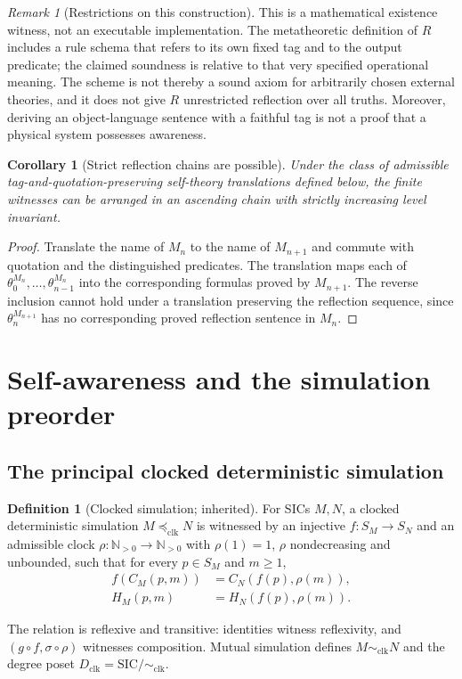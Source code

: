 \documentclass[11pt,letterpaper]{article}
\newtheorem{corollary}[theorem]{Corollary}
\theoremstyle{definition}\newtheorem{definition}[theorem]{Definition}\newtheorem{example}[theorem]{Example}\newtheorem{protocol}[theorem]{Protocol}\newtheorem{question}[theorem]{Open Problem}
\theoremstyle{remark}\newtheorem{remark}[theorem]{Remark}
\newcommand{\N}{\mathbb N}\newcommand{\Pset}{\mathcal P}\newcommand{\Con}{\operatorname{Con}}
\newcommand{\clksim}{\preceq_{\mathrm{clk}}}
\newcommand{\Nth}{\N_{>0}}
\begin{document}
\begin{remark}[Restrictions on this construction]
This is a mathematical existence witness, not an executable implementation. The metatheoretic definition of $R$ includes a rule schema that refers to its own fixed tag and to the output predicate; the claimed soundness is relative to that very specified operational meaning. The scheme is not thereby a sound axiom for arbitrarily chosen external theories, and it does not give $R$ unrestricted reflection over all truths. Moreover, deriving an object-language sentence with a faithful tag is not a proof that a physical system possesses awareness.
\end{remark}
\begin{corollary}[Strict reflection chains are possible]
Under the class of admissible tag-and-quotation-preserving self-theory translations defined below, the finite witnesses can be arranged in an ascending chain with strictly increasing level invariant.
\end{corollary}
\begin{proof}
Translate the name of $M_n$ to the name of $M_{n+1}$ and commute with quotation and the distinguished predicates. The translation maps each of $\theta_0^{M_n},\dots,\theta_{n-1}^{M_n}$ into the corresponding formulas proved by $M_{n+1}$. The reverse inclusion cannot hold under a translation preserving the reflection sequence, since $\theta_n^{M_{n+1}}$ has no corresponding proved reflection sentence in $M_n$.
\end{proof}

\section{Self-awareness and the simulation preorder}
\subsection{The principal clocked deterministic simulation}
\begin{definition}[Clocked simulation; inherited]
For SICs $M,N$, a clocked deterministic simulation $M\clksim N$ is witnessed by an injective $f:S_M\to S_N$ and an admissible clock $\rho:\Nth\to\Nth$ with $\rho(1)=1$, $\rho$ nondecreasing and unbounded, such that for every $p\in S_M$ and $m\ge1$,
\[
\begin{split}
f(C_M(p,m))&=C_N(f(p),\rho(m)),\\
H_M(p,m)&=H_N(f(p),\rho(m)).
\end{split}
\]
\end{definition}
The relation is reflexive and transitive: identities witness reflexivity, and $(g\circ f,\sigma\circ\rho)$ witnesses composition. Mutual simulation defines $M\sim_{\mathrm{clk}}N$ and the degree poset $D_{\mathrm{clk}}=\mathrm{SIC}/\sim_{\mathrm{clk}}$.
\end{document}
